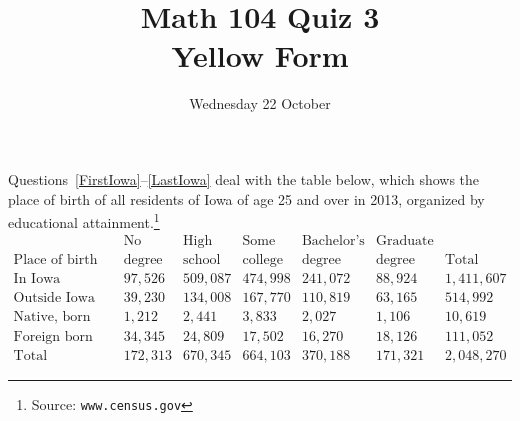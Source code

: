 \documentclass[answers,12pt]{exam}
\title{Math 104 Quiz 3\\Yellow Form}
\date{Wednesday 22 October}
\begin{document}
\maketitle
\begin{center}
\end{center}

Questions~\ref{FirstIowa}--\ref{LastIowa} deal with
the table below, which shows the place of birth of 
all residents of Iowa of age 25 and over
in 2013, organized by educational
attainment.\footnote{Source: \tt www.census.gov}
\[\begin{array}{r|rrrrr|r}
&\text{No}&\text{High}&\text{Some}&\text{Bachelor's}&\text{Graduate}\\
\text{Place of birth}&\text{degree}
&\text{school}&\text{college}&\text{degree}&\text{degree}&\text{Total}
\\\hline
\text{In Iowa}
&97,526&509,087&474,998&241,072&88,924&1,411,607\\
\text{Outside Iowa}
&39,230&134,008&167,770&110,819&63,165&514,992\\
\text{Native, born outside US}
&1,212&2,441&3,833&2,027&1,106&10,619\\
\text{Foreign born}
&34,345&24,809&17,502&16,270&18,126&111,052\\\hline
\text{Total}
&172,313&670,345&664,103&370,188&171,321&2,048,270
\end{array}\]
\end{document}
